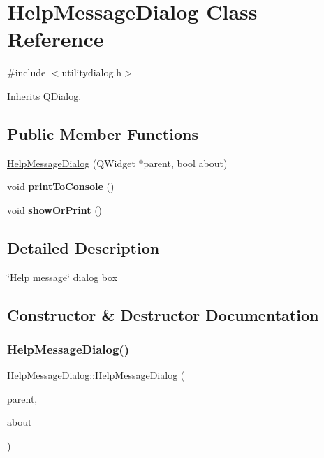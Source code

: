 \hypertarget{class_help_message_dialog}{}\section{Help\+Message\+Dialog Class Reference}
\label{class_help_message_dialog}


{\ttfamily \#include $<$utilitydialog.\+h$>$}



Inherits Q\+Dialog.

\subsection*{Public Member Functions}
\begin{DoxyCompactItemize}
\item 
\mbox{\hyperlink{class_help_message_dialog_a776ac4235e2a407223c7729d7d4af6a9}{Help\+Message\+Dialog}} (Q\+Widget $\ast$parent, bool about)
\item 
\mbox{\label{class_help_message_dialog_aca63e190e624f6fc6208196345d9c23f}} 
void {\bfseries print\+To\+Console} ()
\item 
\mbox{\label{class_help_message_dialog_ac0078c816ad197f6d27352c9591f3c34}} 
void {\bfseries show\+Or\+Print} ()
\end{DoxyCompactItemize}


\subsection{Detailed Description}
\char`\"{}\+Help message\char`\"{} dialog box 

\subsection{Constructor \& Destructor Documentation}
\mbox{\label{class_help_message_dialog_a776ac4235e2a407223c7729d7d4af6a9}} 
\subsubsection{\texorpdfstring{HelpMessageDialog()}{HelpMessageDialog()}}
{\footnotesize\ttfamily Help\+Message\+Dialog\+::\+Help\+Message\+Dialog (\begin{DoxyParamCaption}\item[{Q\+Widget $\ast$}]{parent,  }\item[{bool}]{about }\end{DoxyParamCaption})\hspace{0.3cm}{\ttfamily [explicit]}}

